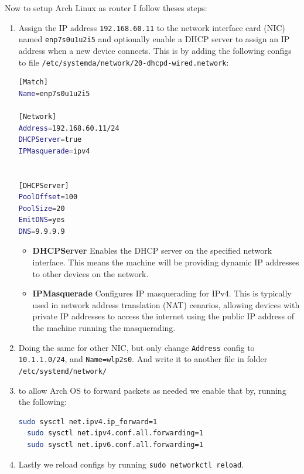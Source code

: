 \documentclass{article}
\def\c#1{\texttt{#1}}
\begin{document}
Now to setup Arch Linux as router I follow theses steps:
\begin{enumerate}
	\item Assign the IP address \c{192.168.60.11} to the network interface card (NIC) named \c{enp7s0u1u2i5}
	      and optionally enable a DHCP server to assign an IP address when a new device connects. This is by adding
	      the following configs to file \c{/etc/systemda/network/20-dhcpd-wired.network}:
	      \begin{lstlisting}[language=bash, caption={Assign IP addresses to interfaces}]
[Match]
Name=enp7s0u1u2i5

[Network]
Address=192.168.60.11/24
DHCPServer=true
IPMasquerade=ipv4


[DHCPServer]
PoolOffset=100
PoolSize=20
EmitDNS=yes
DNS=9.9.9.9
\end{lstlisting}
	      \begin{itemize}
		      \item \textbf{DHCPServer} Enables the DHCP server on the specified network interface. This means the machine will be providing dynamic IP addresses to other devices on the network.
		      \item \textbf{IPMasquerade} Configures IP masquerading for IPv4. This is typically used in network address translation (NAT) cenarios, allowing devices with private IP addresses to access the internet using the public IP address of the machine running the masquerading.
	      \end{itemize}
	\item Doing the same for other NIC, but only change \c{Address} config to \c{10.1.1.0/24},
	      and \c{Name=wlp2s0}. And write it
	      to another file in folder \c{/etc/systemd/network/}

	\item to allow Arch OS to forward packets as needed we enable that by, running the following:
	      \begin{lstlisting}[language=bash, caption={Enable port forwarding}]
  sudo sysctl net.ipv4.ip_forward=1
  sudo sysctl net.ipv4.conf.all.forwarding=1
  sudo sysctl net.ipv6.conf.all.forwarding=1
    \end{lstlisting}
	\item Lastly we reload configs by running \c{sudo networkctl reload}.
\end{enumerate}
\end{document}
